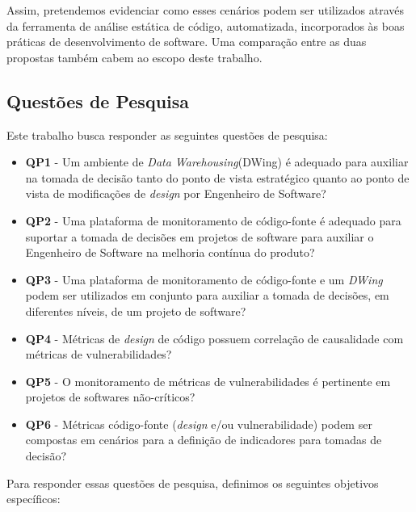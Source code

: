 Assim, pretendemos evidenciar como esses cenários podem ser utilizados através da ferramenta de análise estática de código, automatizada, incorporados às boas práticas de desenvolvimento de software. Uma comparação entre as duas propostas também cabem ao escopo deste trabalho.

%

\subsection{Questões de Pesquisa}

%

Este trabalho busca responder as seguintes questões de pesquisa:

%

\begin{itemize}

\item \textbf{QP1} - Um ambiente de \emph{Data Warehousing}(DWing) é  adequado para auxiliar na tomada de decisão tanto do ponto de vista estratégico quanto ao ponto de vista de modificações de \emph{design} por Engenheiro de Software?
%
\item \textbf{QP2} - Uma plataforma de monitoramento de código-fonte é adequado para suportar a tomada de decisões em projetos de software para auxiliar o Engenheiro de Software na melhoria contínua do produto?
%
\item \textbf{QP3} - Uma plataforma de monitoramento de código-fonte e um \emph{DWing} podem ser utilizados em conjunto para auxiliar a tomada de decisões, em diferentes níveis, de um projeto de software?
%
\item \textbf{QP4} - Métricas de \emph{design} de código possuem correlação de causalidade com métricas de vulnerabilidades?
%
\item \textbf{QP5} - O monitoramento de métricas de vulnerabilidades é pertinente em projetos de softwares não-críticos?
%
\item \textbf{QP6} - Métricas código-fonte (\emph{design} e/ou vulnerabilidade) podem ser compostas em cenários para a definição de indicadores para tomadas de decisão?

\end{itemize}

%

Para responder essas questões de pesquisa, definimos os seguintes objetivos específicos:

